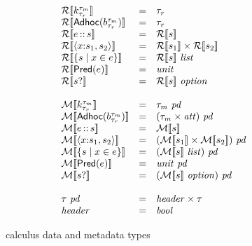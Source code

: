 \begin{figure}

\[
\begin{array}{lcl}
\repty{\Sk} & = & \tau_r \\
\repty{\SAdhoc{b}} & = & \tau_r \\
\repty{\SPath{e}{s}} & = & \repty{s} \\
\repty{\SPair{x}{s_1}{s_2}} & = & \repty{s_1} \times \repty{s_2} \\
\repty{\SSetComp{s}{x}{e}} & = & \repty{s}~\typ{list}  \\
\repty{\SPred{e}} & = & \typ{unit} \\
\repty{\SOption{s}} & = & \repty{s}~\typ{option}  \\
\\
\mdty{\Sk} & = & \tau_m~\mathit{pd}\\
\mdty{\SAdhoc{b}} & = & (\tau_m \times \meta)~\mathit{pd}\\
\mdty{\SPath{e}{s}} & = & \mdty{s} \\
\mdty{\SPair{x}{s_1}{s_2}} & = & \pd{\mdty{s_1} \times \mdty{s_2}} \\
\mdty{\SSetComp{s}{x}{e}} & = & \pd{\mdty{s}~\typ{list}}  \\
\mdty{\SPred{e}} & = & \typ{unit}~\mathit{pd}\\
\mdty{\SOption{s}} & = & \pd{\mdty{s}~\typ{option}}  \\
\\
\tau~\mathit{pd} & = & \typ{header} \times \tau \\
\typ{header} & = & \typ{bool} 
\end{array}
\]
\caption{\forest{} calculus data and metadata types}
\label{fig:calculus-types}
\end{figure}
